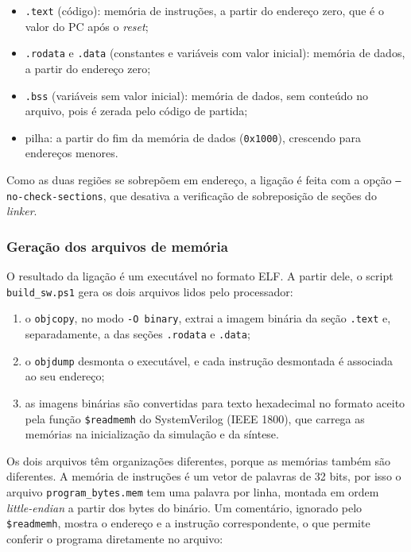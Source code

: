 \begin{itemize}
  \item \texttt{.text} (código): memória de instruções, a partir do endereço
    zero, que é o valor do PC após o \textit{reset};
  \item \texttt{.rodata} e \texttt{.data} (constantes e variáveis com valor
    inicial): memória de dados, a partir do endereço zero;
  \item \texttt{.bss} (variáveis sem valor inicial): memória de dados, sem
    conteúdo no arquivo, pois é zerada pelo código de partida;
  \item pilha: a partir do fim da memória de dados (\texttt{0x1000}),
    crescendo para endereços menores.
\end{itemize}

Como as duas regiões se sobrepõem em endereço, a ligação é feita com a opção
\texttt{--no-check-sections}, que desativa a verificação de sobreposição de
seções do \textit{linker}.

\subsubsection{Geração dos arquivos de memória}

O resultado da ligação é um executável no formato ELF. A partir dele, o
script \texttt{build\_sw.ps1} gera os dois arquivos lidos pelo processador:

\begin{enumerate}
  \item o \texttt{objcopy}, no modo \texttt{-O binary}, extrai a imagem
    binária da seção \texttt{.text} e, separadamente, a das seções
    \texttt{.rodata} e \texttt{.data};
  \item o \texttt{objdump} desmonta o executável, e cada instrução
    desmontada é associada ao seu endereço;
  \item as imagens binárias são convertidas para texto hexadecimal no
    formato aceito pela função \texttt{\$readmemh} do SystemVerilog (IEEE
    1800), que carrega as memórias na inicialização da simulação e da
    síntese.
\end{enumerate}

Os dois arquivos têm organizações diferentes, porque as memórias também são
diferentes. A memória de instruções é um vetor de palavras de 32 bits, por
isso o arquivo \texttt{program\_bytes.mem} tem uma palavra por linha,
montada em ordem \textit{little-endian} a partir dos bytes do binário. Um
comentário, ignorado pelo \texttt{\$readmemh}, mostra o endereço e a
instrução correspondente, o que permite conferir o programa diretamente no
arquivo:

